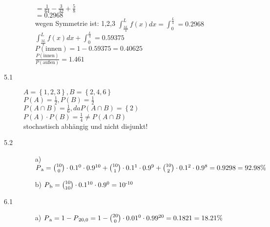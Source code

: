\documentclass[a4paper]{article}
\begin{document}
\begin{description}
\begin{itemize}
									$=\frac{1}{64} - \frac{3}{32} + \frac{5}{8}$\\
									
									$=0.2968$\\
									
									wegen Symmetrie ist:
						1,2,3			
									$\int_\frac{3L}{4}^L f(x)dx = \int_0^\frac{L}{4} = 0.2968$\\
									
									$\int_\frac{3L}{4}^L f(x)dx + \int_0^\frac{L}{4} = 0.59375$\\
									
									$P(\text{innen})= 1-0.59375 = 0.40625$\\
									
									$\frac{P(\text{innen})}{P(\text{außen})}= 1.461$
		\end{itemize}

				
\item[5.1] $A=\left\{1,2,3\right\}, B=\left\{2,4,6\right\}$\\

						$P(A)=\frac{1}{2}, P(B)=\frac{1}{2}$\\
						
						$P(A\cap B)= \frac{1}{6}, da P(A\cap B)=\left\{2\right)$\\
						
						$P(A)\cdot P(B)= \frac{1}{4} \neq P(A\cap B)$\\
						
						stochastisch abhängig und nicht disjunkt!\\
						
\item[5.2] 
		\begin{itemize}
			\item[a)] $P\textsubscript{a}= {{10}\choose{0}} \cdot 0.1\textsuperscript{0} \cdot 0.9\textsuperscript{10} + {{10}\choose{1}} \cdot 0.1\textsuperscript{1}\cdot 0.9\textsuperscript{9} + {{10}\choose{2}} \cdot 0.1\textsuperscript{2}\cdot 0.9\textsuperscript{8} = 0.9298 = 92.98\%$\\
			
			\item[b)] $P\textsubscript{b}= {{10}\choose{10}}\cdot 0.1\textsuperscript{10} \cdot 0.9\textsuperscript{0}= 10\textsuperscript{-10}$\\
			
		\end{itemize}
		
\item[6.1] 
		\begin{itemize}
			\item[a)] $P\textsubscript{a}= 1-P\textsubscript{20,0}= 1-{{20}\choose{0}} \cdot 0.01\textsuperscript{0} \cdot 0.99\textsuperscript{20}= 0.1821= 18.21\%$\\
			

\end{itemize}
\end{description}
\end{document}
